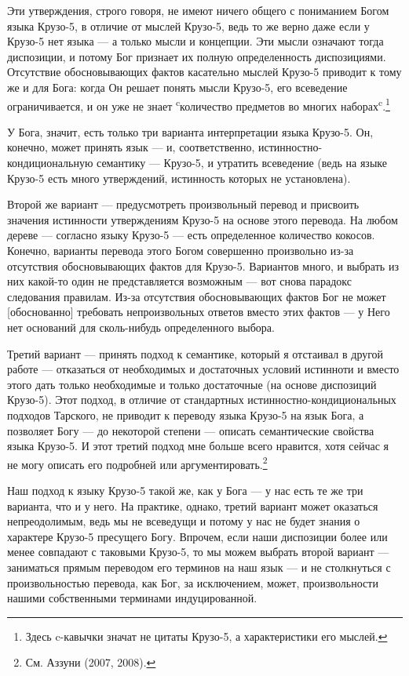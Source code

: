 \documentclass[11pt]{book}
\begin{document}
Эти утверждения, строго говоря, не имеют ничего общего с пониманием Богом языка Крузо-5, в отличие от мыслей Крузо-5, ведь то же верно даже если у Крузо-5 нет языка --- а только мысли и концепции. Эти мысли означают тогда диспозиции, и потому Бог признает их полную определенность диспозициями. Отсутствие обосновывающих фактов касательно мыслей Крузо-5 приводит к тому же и для Бога: когда Он решает понять мысли Крузо-5, его всеведение ограничивается, и он уже не знает \textsuperscript{c}количество предметов во многих наборах\textsuperscript{c}.\footnote{Здесь c-кавычки значат не цитаты Крузо-5, а характеристики его мыслей.}

У Бога, значит, есть только три варианта интерпретации языка Крузо-5. Он, конечно, может принять язык --- и, соответственно, истинностно-кондициональную семантику --- Крузо-5, и утратить всеведение (ведь на языке Крузо-5 есть много утверждений, истинность которых не установлена).

Второй же вариант --- предусмотреть произвольный перевод и присвоить значения истинности утверждениям Крузо-5 на основе этого перевода. На любом дереве --- согласно языку Крузо-5 --- есть определенное количество кокосов. Конечно, варианты перевода этого Богом совершенно произвольно из-за отсутствия обосновывающих фактов для Крузо-5. Вариантов много, и выбрать из них какой-то один не представляется возможным --- вот снова парадокс следования правилам. Из-за отсутствия обосновывающих фактов Бог не может [обоснованно] требовать непроизвольных ответов вместо этих фактов --- у Него нет оснований для сколь-нибудь определенного выбора.

Третий вариант --- принять подход к семантике, который я отстаивал в другой работе --- отказаться от необходимых и достаточных условий истинноти и вместо этого дать только необходимые и только достаточные (на основе диспозиций Крузо-5). Этот подход, в отличие от стандартных истинностно-кондициональных подходов Тарского, не приводит к переводу языка Крузо-5 на язык Бога, а позволяет Богу --- до некоторой степени --- описать семантические свойства языка Крузо-5. И этот третий подход мне больше всего нравится, хотя сейчас я не могу описать его подробней или аргументировать.\footnote{См. Аззуни (2007, 2008).}

Наш подход к языку Крузо-5 такой же, как у Бога --- у нас есть те же три варианта, что и у него. На практике, однако, третий вариант может оказаться непреодолимым, ведь мы не всеведущи и потому у нас не будет знания о характере Крузо-5 пресущего Богу. Впрочем, если наши диспозиции более или менее совпадают с таковыми Крузо-5, то мы можем выбрать второй вариант --- заниматься прямым переводом его терминов на наш язык --- и не столкнуться с произвольностью перевода, как Бог, за исключением, может, произвольности нашими собственными терминами индуцированной.
\end{document}
